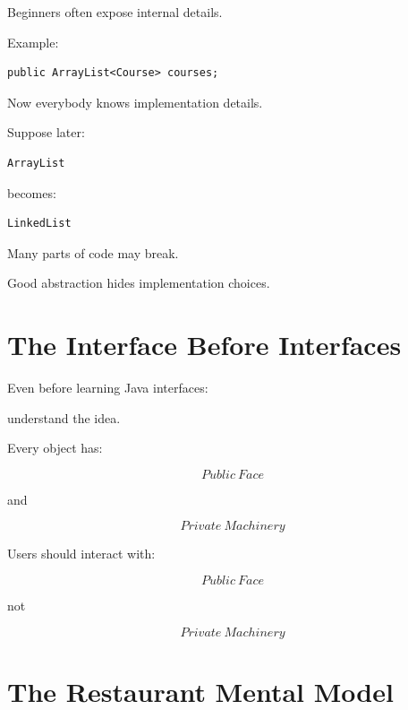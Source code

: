 \documentclass[11pt,a4paper]{book}
\begin{document}
Beginners often expose internal details.


Example:

\begin{verbatim}
public ArrayList<Course> courses;
\end{verbatim}

Now everybody knows implementation details.


Suppose later:

\begin{verbatim}
ArrayList
\end{verbatim}

becomes:

\begin{verbatim}
LinkedList
\end{verbatim}

Many parts of code may break.


Good abstraction hides implementation choices.


\section{The Interface Before Interfaces}

Even before learning Java interfaces:

understand the idea.


Every object has:

\[
Public\ Face
\]

and

\[
Private\ Machinery
\]


Users should interact with:

\[
Public\ Face
\]

not

\[
Private\ Machinery
\]


\section{The Restaurant Mental Model}
\end{document}
